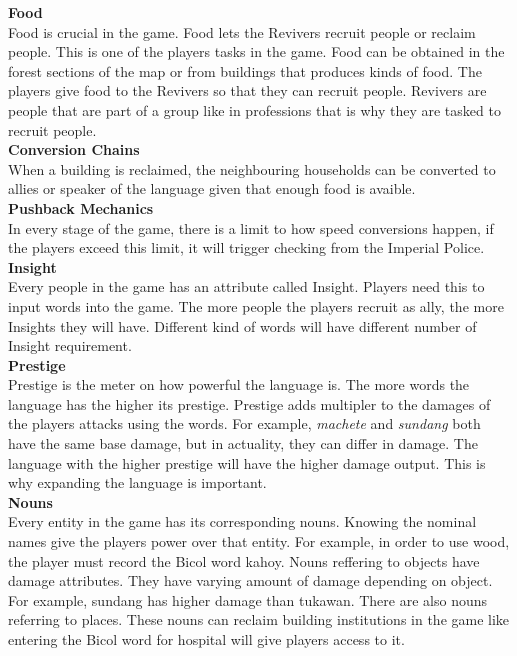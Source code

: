 \documentclass[11pt]{article}
\begin{document}
\textbf{Food}\\
Food is crucial in the game. Food lets the Revivers recruit people or reclaim people. This is one of the players tasks in the game. Food can be obtained in the forest sections of the map or from buildings that produces kinds of food. The players give food to the Revivers so that they can recruit people. Revivers are people that are part of a group like in professions that is why they are tasked to recruit people.\\

\textbf{Conversion Chains}\\
When a building is reclaimed, the neighbouring households can be converted to allies or speaker of the language given that enough food is avaible.\\

\textbf{Pushback Mechanics}\\
In every stage of the game, there is a limit to how speed conversions happen, if the players exceed this limit, it will trigger checking from the Imperial Police.\\

\textbf{Insight}\\
Every people in the game has an attribute called Insight. Players need this to input words into the game. The more people the players recruit as ally, the more Insights they will have. Different kind of words will have different number of Insight requirement.\\

\hypertarget{prestige}{\textbf{Prestige}}\\
Prestige  is the meter on how powerful the language is. The more words the language has the higher its prestige. Prestige adds multipler to the damages of the players attacks using the words. For example, \textit{machete} and \textit{sundang} both have the same base damage, but in actuality, they can differ in damage. The language with the higher prestige will have the higher damage output. This is why expanding the language is important.\\

\textbf{Nouns}\\
Every entity in the game has its corresponding nouns. Knowing the nominal names give the players power over that entity. For example, in order to use wood, the player must record the Bicol word kahoy. Nouns reffering to objects have damage attributes. They have varying amount of damage depending on object. For example, sundang has higher damage than tukawan.
There are also nouns referring to places. These nouns can reclaim building institutions in the game like entering the Bicol word for hospital will give players access to it.
\end{document}
